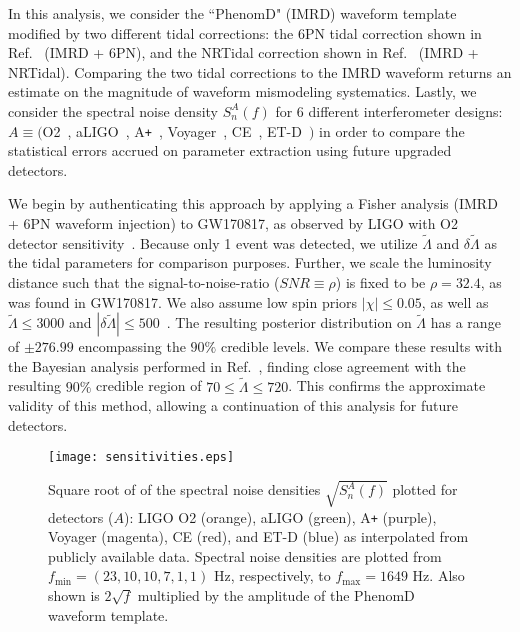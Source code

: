 \documentclass[prd,twocolumn,nofootinbib,superscriptaddress,amsmath,amssymb]{revtex4-1}
\begin{document}
In this analysis, we consider the ``PhenomD" (IMRD) waveform template~\cite{PhenomDI,PhenomDII} modified by two different tidal corrections: the 6PN tidal correction shown in Ref.~\cite{Wade:tidalCorrections} (IMRD + 6PN), and the NRTidal correction shown in Ref.~\cite{Samajdar:NRTidal} (IMRD + NRTidal).
Comparing the two tidal corrections to the IMRD waveform returns an estimate on the magnitude of waveform mismodeling systematics.
Lastly, we consider the spectral noise density $S_n^A(f)$ for 6 different interferometer designs: $A \equiv ($O2~\cite{aLIGO}, aLIGO~\cite{aLIGO}, A\texttt{+}~\cite{Ap_Voyager_CE}, Voyager~\cite{Ap_Voyager_CE}, CE~\cite{ET}, ET-D~\cite{Ap_Voyager_CE}$)$ in order to compare the statistical errors accrued on parameter extraction using future upgraded detectors.

We begin by authenticating this approach by applying a Fisher analysis (IMRD + 6PN waveform injection) to GW170817, as observed by LIGO with O2 detector sensitivity~\cite{aLIGO}.
Because only 1 event was detected, we utilize $\tilde\Lambda$ and $\delta\tilde\Lambda$ as the tidal parameters for comparison purposes.
Further, we scale the luminosity distance such that the signal-to-noise-ratio ($SNR \equiv \rho$) is fixed to be $\rho=32.4$, as was found in GW170817.
We also assume low spin priors $|\chi| \leq 0.05$, as well as $\tilde{\Lambda} \leq 3000$ and $|\delta \tilde{\Lambda}| \leq 500$~\cite{Wade:LambdaPriors}.
The resulting posterior distribution on $\tilde{\Lambda}$ has a range of $\pm 276.99$ encompassing the $90\%$ credible levels.
We compare these results with the Bayesian analysis performed in Ref.~\cite{TheLIGOScientific:2017qsa,Abbott2018}, finding close agreement with the resulting $90\%$ credible region of $70 \leq \tilde{\Lambda} \leq 720$.
This confirms the approximate validity of this method, allowing a continuation of this analysis for future detectors.
\begin{figure}
\begin{center} 
\texttt{[image: sensitivities.eps]}
\end{center}
\caption{
Square root of of the spectral noise densities $\sqrt{S_n^A(f)}$ plotted for detectors ($A$): LIGO O2 (orange), aLIGO (green), A\texttt{+} (purple), Voyager (magenta), CE (red), and ET-D (blue) as interpolated from publicly available data.
Spectral noise densities are plotted from $f_{\text{min}}=(23,10,10,7,1,1) \text{ Hz}$, respectively, to $f_{\text{max}}=1649 \text{ Hz}$.
Also shown is $2 \sqrt{f}$ multiplied by the amplitude of the PhenomD~\cite{PhenomDI,PhenomDII} waveform template.
}
\label{fig:sensitivities}
\end{figure}
\end{document}
